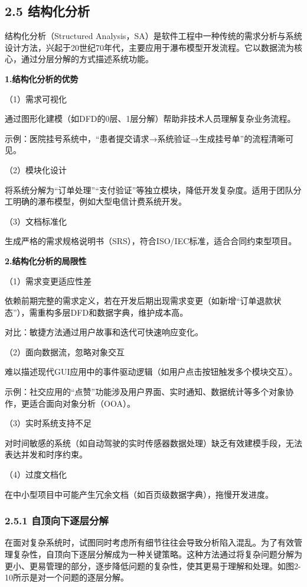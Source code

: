 \subsection{2.5 结构化分析}\label{ux7ed3ux6784ux5316ux5206ux6790}

结构化分析（Structured Analysis，SA）是软件工程中一种传统的需求分析与系统设计方法，兴起于20世纪70年代，主要应用于瀑布模型开发流程。它以数据流为核心，通过分层分解的方式描述系统功能。

\textbf{1.结构化分析的优势}

（1）需求可视化

通过图形化建模（如DFD的0层、1层分解）帮助非技术人员理解复杂业务流程。

示例：医院挂号系统中，``患者提交请求→系统验证→生成挂号单''的流程清晰可见。

（2）模块化设计

将系统分解为``订单处理''``支付验证''等独立模块，降低开发复杂度。适用于团队分工明确的瀑布模型，例如大型电信计费系统开发。

（3）文档标准化

生成严格的需求规格说明书（SRS），符合ISO/IEC标准，适合合同约束型项目。

\textbf{2.结构化分析的局限性}

（1）需求变更适应性差

依赖前期完整的需求定义，若在开发后期出现需求变更（如新增``订单退款状态''），需重构多层DFD和数据字典，维护成本高。

对比：敏捷方法通过用户故事和迭代可快速响应变化。

（2）面向数据流，忽略对象交互

难以描述现代GUI应用中的事件驱动逻辑（如用户点击按钮触发多个模块交互）。

示例：社交应用的``点赞''功能涉及用户界面、实时通知、数据统计等多个对象协作，更适合面向对象分析（OOA）。

（3）实时系统支持不足

对时间敏感的系统（如自动驾驶的实时传感器数据处理）缺乏有效建模手段，无法表达并发和时序约束。

（4）过度文档化

在中小型项目中可能产生冗余文档（如百页级数据字典），拖慢开发进度。

\subsubsection{2.5.1 自顶向下逐层分解}\label{ux81eaux9876ux5411ux4e0bux9010ux5c42ux5206ux89e3}

在面对复杂系统时，试图同时考虑所有细节往往会导致分析陷入混乱。为了有效管理复杂性，自顶向下逐层分解成为一种关键策略。这种方法通过将复杂问题分解为更小、更易管理的部分，逐步降低问题的复杂性，使其更易于理解和处理。如图2-10所示是对一个问题的逐层分解。

